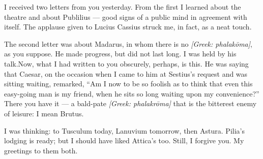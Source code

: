 

 I received two letters from you yesterday. From the first I learned about the theatre and about Publilius --- good signs of a public mind in agreement with itself. The applause given to Lucius Cassius struck me, in fact, as a neat touch.

 The second letter was about Madarus, in whom there is no \textit{[Greek: phalakōma]}\dag, as you suppose. He made progress, but did not last long. I was held by his talk.\dag Now, what I had written to you obscurely, perhaps, is this. He was saying that Caesar, on the occasion when I came to him at Sestius's request and was sitting waiting, remarked, ``Am I now to be so foolish as to think that even this easy-going man is my friend, when he sits so long waiting upon my convenience?'' There you have it --- a bald-pate \textit{[Greek: phalakrōma]} that is the bitterest enemy of leisure: I mean Brutus.

 I was thinking: to Tusculum today, Lanuvium tomorrow, then Astura. Pilia's lodging is ready; but I should have liked Attica's too. Still, I forgive you. My greetings to them both.

